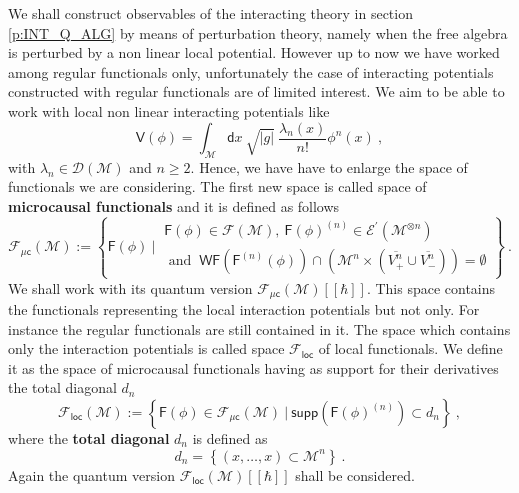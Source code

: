 \documentclass[11pt]{book}
\newcommand{\supp}{\mathsf{supp}}
\newcommand{\WF}{\mathsf{WF}}
\newcommand{\loc}{\mathsf{loc}}
\newcommand{\abs}[1]{\left|#1\right|}
\newcommand{\Dcal}{\mathcal{D}}
\newcommand{\Ecal}{\mathcal{E}}
\newcommand{\Fcal}{\mathcal{F}}
\newcommand{\Mcal}{\mathcal{M}}
\newcommand{\Fsf}{\mathsf{F}}
\newcommand{\Vsf}{\mathsf{V}}
\newcommand{\csf}{\mathsf{c}}
\newcommand{\dsf}{\mathsf{d}}
\theoremstyle{break}
\begin{document}
We shall construct observables of the interacting theory in section \ref{p:INT_Q_ALG} by means of perturbation theory, namely when the free algebra is perturbed by a non linear local potential. However up to now we have worked among regular functionals only, unfortunately the case of interacting potentials constructed with regular functionals are of limited interest. We aim to be able to work with local non linear interacting potentials like
%
\begin{equation}
\Vsf(\phi) = \int_\Mcal \dsf x \ \sqrt{\abs{g}} \ \frac{\lambda_n(x)}{n!} \phi^n(x) \ ,
\label{eq:local_pot}
\end{equation}
%
with $\lambda_n \in \Dcal(\Mcal)$ and $n\geq2$. Hence, we have have to enlarge the space of functionals we are considering. The first new space is  called space of \textbf{microcausal functionals} and it is defined as follows
%
\begin{equation}
\Fcal_{\mu\csf}(\Mcal) := \left\{ 
\Fsf(\phi) \ \bigg| \ 
\begin{array}{l}
\Fsf(\phi) \in \Fcal(\Mcal), \ \Fsf(\phi)^{(n)} \in \Ecal^\prime(\Mcal^{\otimes n}) \\
\mbox{ and } \ \WF(\Fsf^{(n)}(\phi)) \cap \left( \Mcal^n \times ( \overline{V^{n}_{+}} \cup \overline{V^{n}_{-}} ) \right)  = \emptyset 
\end{array}
\right\} \ .
\label{eq:func_micro}
\end{equation}
\index{$\Fcal_{\mu\csf}(\Mcal)$}
%
We shall work with its quantum version $\Fcal_{\mu\csf}(\Mcal)[[\hbar]]$. This space contains the functionals representing the local interaction potentials but not only. For instance the regular functionals are still contained in it. The space which contains only the interaction potentials is called space $\mathcal{F}_\mathsf{loc}$ of local functionals. We define it as the space of microcausal functionals having as support for their derivatives the total diagonal $d_n$
%
\begin{equation*}
\Fcal_\loc(\Mcal) := \left\{ \Fsf(\phi) \in \Fcal_{\mu\csf}(\Mcal) \ \bigg| \ \supp\left(\Fsf(\phi)^{(n)}\right) \subset d_n \right\} \ ,
\label{eq:func_loc}
\end{equation*}
\index{$\Fcal_{\mathsf{loc}}(\Mcal)$}
%
where the \textbf{total diagonal} $d_n$ is defined as
%
\begin{equation}
d_n = \left\{ (x,\dots,x) \subset \Mcal^n \right\} \ .
\label{eq:total_diag}
\end{equation}
%
Again the quantum version $\Fcal_{\mathsf{loc}}(\Mcal)[[\hbar]]$ shall be considered.
\end{document}
